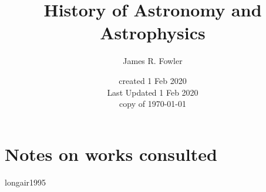 \documentclass[letterpaper]{article}
\begin{document}
\title{History of Astronomy and Astrophysics}
\author{James R. Fowler}
\date{created 1 Feb 2020\\ Last Updated 1 Feb 2020\\ copy of \today}

\tableofcontents

\section{Notes on works consulted}

{longair1995}

\printbibliography
\end{document}
